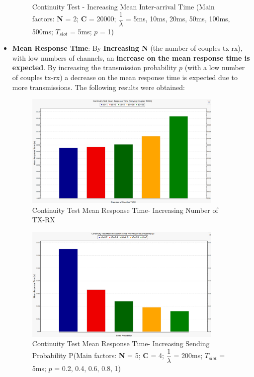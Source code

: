 \begin{itemize}
\begin{figure}[H]
		\caption{Continuity Test - Increasing Mean Inter-arrival Time (Main factors: \textbf{N} = 2; \textbf{C} = 20000; $\dfrac{1}{\lambda}$ = 5ms, 10ms, 20ms, 50ms, 100ms, 500ms; $T_{slot}$ = 5ms; $p$ = 1)}
		\label {img: continuityTestThLambda}
	\end{figure}
	\item \textbf{Mean Response Time}: By \textbf{Increasing N} (the number of couples tx-rx), with low numbers of channels, an \textbf{increase on the mean response time is expected}. By increasing the transmission probability $p$ (with a low number of couples tx-rx) a decrease on the mean response time is expected due to more transmissions. The following results were obtained:
	\begin{figure}[H]
		\centering
		\includegraphics[width=0.9\textwidth]{img/ContinuityTest_ResponseTIme_TXRXVarying}
		\caption{Continuity Test Mean Response Time- Increasing Number of TX-RX}
		\label {img: continuityTestTXRXResponse}
	\end{figure}
	\begin{figure}[H]
		\centering
		\includegraphics[width=0.9\textwidth]{img/ContinuityTest_ResponseTIme_VaryingP.png}
		\caption{Continuity Test Mean Response Time- Increasing Sending Probability P(Main factors: \textbf{N} = 5; \textbf{C} = 4; $\dfrac{1}{\lambda}$ = 200ms; $T_{slot}$ = 5ms; $p$ = 0.2, 0.4, 0.6, 0.8, 1)}
		\label {img: continuityTestResponseLambda}
	\end{figure}
\end{itemize} 
